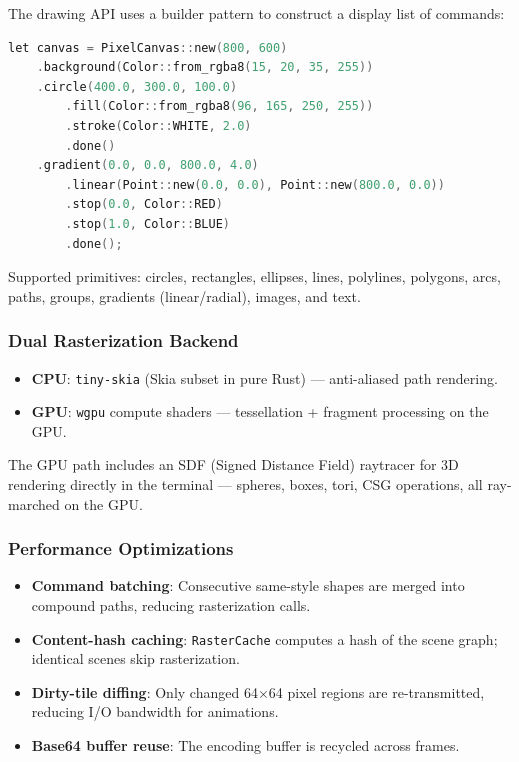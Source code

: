 \documentclass[11pt,a4paper]{article}
\begin{document}
The drawing API uses a builder pattern to construct a display list
of commands:

\begin{lstlisting}[language=C]
let canvas = PixelCanvas::new(800, 600)
    .background(Color::from_rgba8(15, 20, 35, 255))
    .circle(400.0, 300.0, 100.0)
        .fill(Color::from_rgba8(96, 165, 250, 255))
        .stroke(Color::WHITE, 2.0)
        .done()
    .gradient(0.0, 0.0, 800.0, 4.0)
        .linear(Point::new(0.0, 0.0), Point::new(800.0, 0.0))
        .stop(0.0, Color::RED)
        .stop(1.0, Color::BLUE)
        .done();
\end{lstlisting}

Supported primitives: circles, rectangles, ellipses, lines, polylines,
polygons, arcs, paths, groups, gradients (linear/radial), images,
and text.

\subsubsection{Dual Rasterization Backend}

\begin{itemize}[nosep]
    \item \textbf{CPU}: \texttt{tiny-skia} (Skia subset in pure Rust) ---
          anti-aliased path rendering.
    \item \textbf{GPU}: \texttt{wgpu} compute shaders --- tessellation +
          fragment processing on the GPU.
\end{itemize}

The GPU path includes an SDF (Signed Distance Field) raytracer for 3D
rendering directly in the terminal --- spheres, boxes, tori, CSG
operations, all ray-marched on the GPU.

\subsubsection{Performance Optimizations}

\begin{itemize}[nosep]
    \item \textbf{Command batching}: Consecutive same-style shapes are
          merged into compound paths, reducing rasterization calls.
    \item \textbf{Content-hash caching}: \texttt{RasterCache} computes
          a hash of the scene graph; identical scenes skip rasterization.
    \item \textbf{Dirty-tile diffing}: Only changed 64$\times$64 pixel
          regions are re-transmitted, reducing I/O bandwidth for
          animations.
    \item \textbf{Base64 buffer reuse}: The encoding buffer is recycled
          across frames.
\end{itemize}
\end{document}
